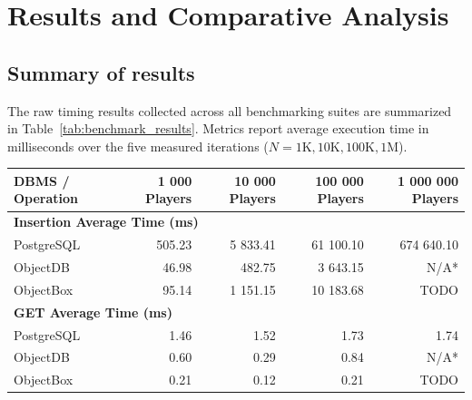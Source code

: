 \documentclass{article}
\begin{document}
\section{Results and Comparative Analysis}
\label{sec:results}

\subsection{Summary of results}
The raw timing results collected across all benchmarking suites are summarized in Table~\ref{tab:benchmark_results}. Metrics report average execution time in milliseconds over the five measured iterations ($N = 1\text{K}, 10\text{K}, 100\text{K}, 1\text{M}$).

\begin{table}[H]
    \centering
    \small
    \begin{tabular}{lrrrr}
        \toprule
        \textbf{DBMS / Operation} & \textbf{1 000 Players} & \textbf{10 000 Players} & \textbf{100 000 Players} & \textbf{1 000 000 Players} \\
        \midrule
        \multicolumn{5}{l}{\textbf{Insertion Average Time (ms)}}                                                                             \\
        \quad PostgreSQL          & 505.23                 & 5 833.41                & 61 100.10                & 674 640.10                 \\
        \quad ObjectDB            & 46.98                  & 482.75                  & 3 643.15                 & N/A*                       \\
        \quad ObjectBox           & 95.14                  & 1 151.15                & 10 183.68                & TODO                      \\
        \midrule
        \multicolumn{5}{l}{\textbf{GET Average Time (ms)}}                                                                                   \\
        \quad PostgreSQL          & 1.46                   & 1.52                    & 1.73                     & 1.74                       \\
        \quad ObjectDB            & 0.60                   & 0.29                    & 0.84                     & N/A*                       \\
        \quad ObjectBox           & 0.21                   & 0.12                    & 0.21                     & TODO                      \\

\end{tabular}
\end{table}
\end{document}
